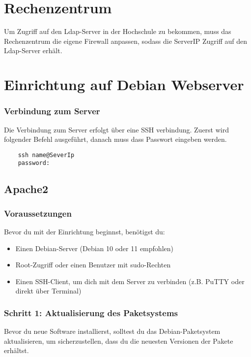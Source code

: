 \documentclass[a4paper,12pt]{article}
\begin{document}
\section{Rechenzentrum}

Um Zugriff auf den Ldap-Server in der Hochschule zu bekommen, muss das Rechenzentrum die eigene Firewall anpassen,
sodass die ServerIP Zugriff auf den Ldap-Server erhält.



\section{Einrichtung auf Debian Webserver}

\subsubsection{Verbindung zum Server}

Die Verbindung zum Server erfolgt über eine SSH verbindung. 
Zuerst wird folgender Befehl ausgeführt, danach muss dass Passwort eingeben werden. 
 
\begin{lstlisting}
    ssh name@SeverIp
    password:  
\end{lstlisting}

\subsection{Apache2}
\subsubsection{Voraussetzungen}
Bevor du mit der Einrichtung beginnst, benötigst du:
\begin{itemize}
    \item Einen Debian-Server (Debian 10 oder 11 empfohlen)
    \item Root-Zugriff oder einen Benutzer mit sudo-Rechten
    \item Einen SSH-Client, um dich mit dem Server zu verbinden (z.B. PuTTY oder direkt über Terminal)
\end{itemize}

\subsubsection{Schritt 1: Aktualisierung des Paketsystems}
Bevor du neue Software installierst, solltest du das Debian-Paketsystem aktualisieren, um sicherzustellen, dass du die neuesten Versionen der Pakete erhältst.
\end{document}
